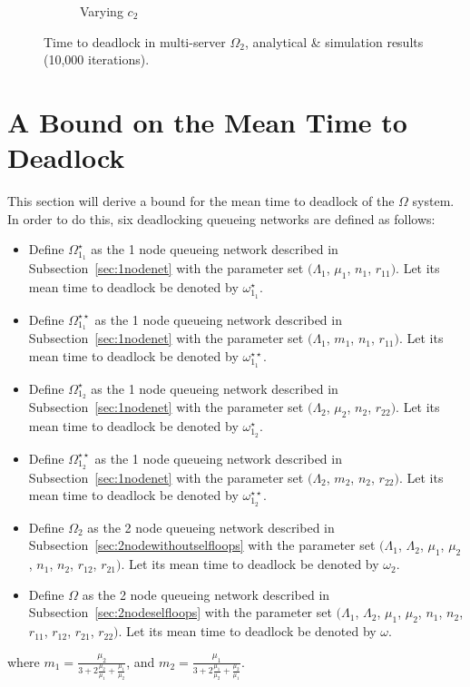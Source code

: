 \documentclass{article}
\begin{document}
\begin{figure}[!htbp]
\begin{center}
\begin{subfigure}[b]{0.34\textwidth}
    \caption{Varying $c_2$}
    \label{fig:2Nms_c2}
  \end{subfigure}
  \end{center}
  \caption{Time to deadlock in multi-server $\Omega_2$, analytical \& simulation results (10,000 iterations).}
  \label{fig:timestodeadlock2nodemultiserver}
\end{figure}




\section{A Bound on the Mean Time to Deadlock}\label{sec:bound}
This section will derive a bound for the mean time to deadlock of the $\Omega$ system.
In order to do this, six deadlocking queueing networks are defined as follows:

\begin{itemize}
  \item Define $\Omega_{1_1}^{\star}$ as the 1 node queueing network described in Subsection~\ref{sec:1nodenet} with the parameter set $(\Lambda_1$, $\mu_1$, $n_1$, $r_{11})$. Let its mean time to deadlock be denoted by $\omega_{1_1}^{\star}$.
  \item Define $\Omega_{1_1}^{\star\star}$ as the 1 node queueing network described in Subsection~\ref{sec:1nodenet} with the parameter set $(\Lambda_1$, $m_1$, $n_1$, $r_{11})$. Let its mean time to deadlock be denoted by $\omega_{1_1}^{\star\star}$.
  \item Define $\Omega_{1_2}^{\star}$ as the 1 node queueing network described in Subsection~\ref{sec:1nodenet} with the parameter set $(\Lambda_2$, $\mu_2$, $n_2$, $r_{22})$. Let its mean time to deadlock be denoted by $\omega_{1_2}^{\star}$.
  \item Define $\Omega_{1_2}^{\star\star}$ as the 1 node queueing network described in Subsection~\ref{sec:1nodenet} with the parameter set $(\Lambda_2$, $m_2$, $n_2$, $r_{22})$. Let its mean time to deadlock be denoted by $\omega_{1_2}^{\star\star}$.
  \item Define $\Omega_2$ as the 2 node queueing network described in Subsection~\ref{sec:2nodewithoutselfloops} with the parameter set $(\Lambda_1$, $\Lambda_2$, $\mu_1$, $\mu_2$, $n_1$, $n_2$, $r_{12}$, $r_{21})$. Let its mean time to deadlock be denoted by $\omega_2$.
  \item Define $\Omega$ as the 2 node queueing network described in Subsection~\ref{sec:2nodeselfloops} with the parameter set $(\Lambda_1$, $\Lambda_2$, $\mu_1$, $\mu_2$, $n_1$, $n_2$, $r_{11}$, $r_{12}$, $r_{21}$, $r_{22})$. Let its mean time to deadlock be denoted by $\omega$.
\end{itemize}
where $m_1 = \frac{\mu_2}{3 + 2\frac{\mu_2}{\mu_1} + \frac{\mu_1}{\mu_2}}$, and $m_2 = \frac{\mu_1}{3 + 2\frac{\mu_1}{\mu_2} + \frac{\mu_2}{\mu_1}}$.
\end{document}
